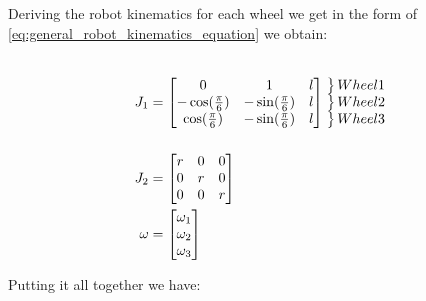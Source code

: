 \documentclass{article}
\newcommand\coolrightbrace[2]{%
\left.\vphantom{\begin{matrix} #1 \end{matrix}}\right\}#2}
\begin{document}
\newpage
Deriving the robot kinematics for each wheel we get in the form of 
\ref{eq:general_robot_kinematics_equation} we obtain:

\begin{align}
	\vphantom{%
    \begin{matrix}
    	\overbrace{XYZ}^{\mbox{$R$}} \\ \\
    	\underbrace{pqr}_{\mbox{$S$}}
    \end{matrix}}%
	J_{1} &= 
	\begin{bmatrix}
			0 & 1 & l \\
  	    	-\cos(\frac{\pi}{6}) & -\sin(\frac{\pi}{6}) & l \\
   	    	\cos(\frac{\pi}{6}) & -\sin(\frac{\pi}{6}) & l
    \end{bmatrix}
    \begin{matrix}%
        \coolrightbrace{x}{Wheel 1}\\
	    \coolrightbrace{x}{Wheel 2}\\
	    \coolrightbrace{x}{Wheel 3}
    \end{matrix} \\
    J_{2} &=
    \begin{bmatrix}
        r & 0 & 0 \\
        0 & r & 0 \\
        0 & 0 & r
    \end{bmatrix} \\
    \omega &= 
	    \begin{bmatrix}
	       \omega_{1} \\
	       \omega_{2} \\
	       \omega_{3} \\
	    \end{bmatrix}
\end{align}

Putting it all together we have:
\end{document}
